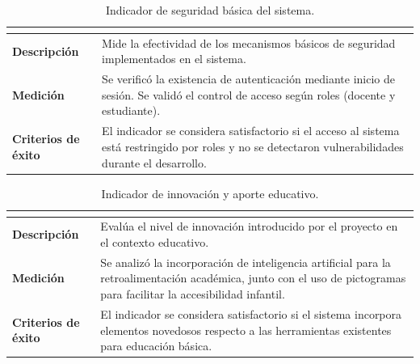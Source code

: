 \begin{table}[H]
\centering
\caption{Indicador de seguridad básica del sistema.}
\label{tab:ind_seg}
\footnotesize
\renewcommand{\arraystretch}{1.25}
\begin{tabularx}{\textwidth}{|>{\bfseries}p{3.2cm}|X|}
\hline
\rowcolor{headblue}\multicolumn{2}{|c|}{\textbf{Seguridad de acceso}}\\\hline
Descripción & Mide la efectividad de los mecanismos básicos de seguridad implementados en el sistema. \\\hline
Medición & Se verificó la existencia de autenticación mediante inicio de sesión. Se validó el control de acceso según roles (docente y estudiante). \\\hline
Criterios de éxito & El indicador se considera satisfactorio si el acceso al sistema está restringido por roles y no se detectaron vulnerabilidades durante el desarrollo. \\\hline
\end{tabularx}
\end{table}
\elaboracion

\begin{table}[H]
\centering
\caption{Indicador de innovación y aporte educativo.}
\label{tab:ind_innov}
\footnotesize
\renewcommand{\arraystretch}{1.25}
\begin{tabularx}{\textwidth}{|>{\bfseries}p{3.2cm}|X|}
\hline
\rowcolor{headblue}\multicolumn{2}{|c|}{\textbf{Innovación educativa}}\\\hline
Descripción & Evalúa el nivel de innovación introducido por el proyecto en el contexto educativo. \\\hline
Medición & Se analizó la incorporación de inteligencia artificial para la retroalimentación académica, junto con el uso de pictogramas para facilitar la accesibilidad infantil. \\\hline
Criterios de éxito & El indicador se considera satisfactorio si el sistema incorpora elementos novedosos respecto a las herramientas existentes para educación básica. \\\hline
\end{tabularx}
\end{table}
\elaboracion
